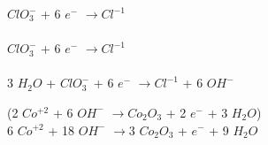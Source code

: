 \documentclass[../Práctica.root.tex]{subfiles}
\newcommand{\lra}{\ensuremath{\longrightarrow{}}}
\begin{document}
\begin{enumerate}
\begin{enumerate}
\begin{itemize}
\begin{multicols}{2}
                                  \columnbreak

                                  $ClO_3^-$ + 6 $e^-$ \lra $Cl^{-1}$ \\
                                   \\
                                   $ClO_3^-$ + 6 $e^-$ \lra $Cl^{-1}$ \\
                                   \\
                                  3 $H_2O$ + $ClO_3^-$ + 6 $e^-$ \lra $Cl^{-1}$ + 6 $OH^-$\\
                              \end{multicols}
                              \begin{multicols}{2}
                                  (2 $Co^{+2}$ + 6 $OH^-$ \lra $Co_2O_3$ + 2 $e^-$ + 3 $H_2O$) \\
                                  6 $Co^{+2}$ + 18 $OH^-$ \lra 3 $Co_2O_3$ +  $e^-$ + 9 $H_2O$

                                  \columnbreak


\end{multicols}
\end{itemize}
\end{enumerate}
\end{enumerate}
\end{document}
